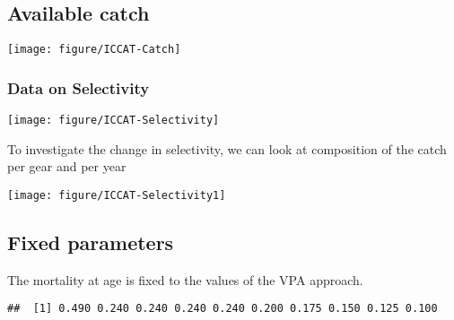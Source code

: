 \documentclass[a4paper]{article}\usepackage{graphicx, color}
\makeatletter
\def\maxwidth{ %
  \ifdim\Gin@nat@width>\linewidth
    \linewidth
  \else
    \Gin@nat@width
  \fi
}
\newenvironment{kframe}{%
 \def\at@end@of@kframe{}%
 \ifinner\ifhmode%
  \def\at@end@of@kframe{\end{minipage}}%
  \begin{minipage}{\columnwidth}%
 \fi\fi%
 \def\FrameCommand##1{\hskip\@totalleftmargin \hskip-\fboxsep
 \colorbox{shadecolor}{##1}\hskip-\fboxsep
     \hskip-\linewidth \hskip-\@totalleftmargin \hskip\columnwidth}%
 \MakeFramed {\advance\hsize-\width
   \@totalleftmargin\z@ \linewidth\hsize
   \@setminipage}}%
 {\par\unskip\endMakeFramed%
 \at@end@of@kframe}
\newenvironment{knitrout}{}{} %
\makeatother
\begin{document}
\subsection{Available catch}
\begin{knitrout}
\color{fgcolor}

{\centering \texttt{[image: figure/ICCAT-Catch]} 

}



\end{knitrout}

\subsubsection{Data on Selectivity}


\begin{knitrout}
\color{fgcolor}

{\centering \texttt{[image: figure/ICCAT-Selectivity]} 

}



\end{knitrout}


To investigate the  change in selectivity, we can  look at composition
of the catch per gear and per year
\begin{knitrout}
\color{fgcolor}

{\centering \texttt{[image: figure/ICCAT-Selectivity1]} 

}



\end{knitrout}



\subsection{Fixed parameters}
The mortality at age is fixed to the values of the VPA approach.
\begin{knitrout}
\color{fgcolor}\begin{kframe}
\begin{verbatim}
##  [1] 0.490 0.240 0.240 0.240 0.240 0.200 0.175 0.150 0.125 0.100
\end{verbatim}
\end{kframe}
\end{knitrout}
\end{document}
